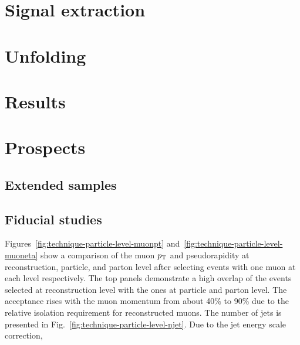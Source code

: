 \section{Signal extraction}
\label{sec:diff13-fit}


\section{Unfolding}

\section{Results}


\section{Prospects}

\subsection{Extended samples}

\subsection{Fiducial studies}
\label{sec:diff13-fiducial-studies}



Figures~\ref{fig:technique-particle-level-muonpt} and~\ref{fig:technique-particle-level-muoneta} show a comparison of the muon $p_\textrm{T}$ and pseudorapidity at reconstruction, particle, and parton level after selecting events with one muon at each level respectively. The top panels demonstrate a high overlap of the events selected at reconstruction level with the ones at particle and parton level. The acceptance rises with the muon momentum from about 40\% to 90\% due to the relative isolation requirement for reconstructed muons. The number of jets is presented in Fig.~\ref{fig:technique-particle-level-njet}. Due to the jet energy scale correction, 


